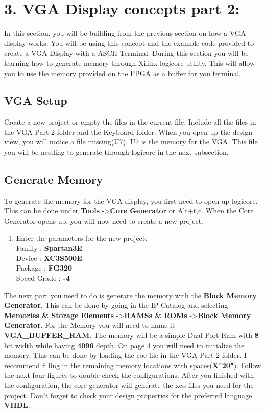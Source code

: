 \documentclass{article}
\begin{document}
\newpage

\section{3. VGA Display concepts part 2:}
In this section, you will be building from the previous section on how a VGA display works. You will be using this concept and the example code provided to create a VGA Display with a ASCII Terminal. During this section you will be learning how to generate memory through Xilinx\textsuperscript{\textregistered} logicore utility. This will allow you to use the memory provided on the FPGA as a buffer for you terminal.

\subsection{VGA Setup}
Create a new project or empty the files in the current file. Include all the files in the VGA Part 2 folder and the Keyboard folder. When you open up the design view, you will notice a file missing(U7). U7 is the memory for the VGA. This file you will be needing to generate through logicore in the next subsection.

\subsection{Generate Memory}
To generate the memory for the VGA display, you first need to open up logicore. This can be done under \textbf{Tools} -\textgreater \textbf{Core Generator} or Alt+t,c. When the Core Generator opens up, you will now need to create a new project.

\begin{enumerate}
  \item Enter the parameters for the new project: \hfill \\
  Family : \textbf{Spartan3E}\\
  Device : \textbf{XC3S500E}\\
  Package : \textbf{FG320}\\
  Speed Grade : \textbf{-4}\\
\end{enumerate}

The next part you need to do is generate the memory with the \textbf{Block Memory Generator}. This can be done by going in the IP Catalog and selecting \textbf{Memories \& Storage Elements} -\textgreater \textbf{RAMSs \& ROMs} -\textgreater \textbf{Block Memory Generator}. For the Memory you will need to name it \textbf{VGA\_BUFFER\_RAM}. The memory will be a simple Dual Port Ram with \textbf{8} bit width while having \textbf{4096} depth. On page 4 you will need to initialize the memory. This can be done by loading the coe file in the VGA Part 2 folder. I recommend filling in the remaining memory locations with spaces(\textbf{X"20"}). Follow the next four figures to double check the configurations. After you finished with the configuration, the core generator will generate the xco files you need for the project. Don't forget to check your design properties for the preferred language \textbf{VHDL}. 
\end{document}
